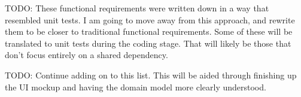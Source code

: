 \label{ch: functional}

TODO: These functional requirements were written down in a way that resembled unit tests. I am going to move away from this approach, and rewrite them to be closer to traditional functional requirements. Some of these will be translated to unit tests during the coding stage. That will likely be those that don't focus entirely on a shared dependency.

TODO: Continue adding on to this list. This will be aided through finishing up the UI mockup and having the domain model more clearly understood.
